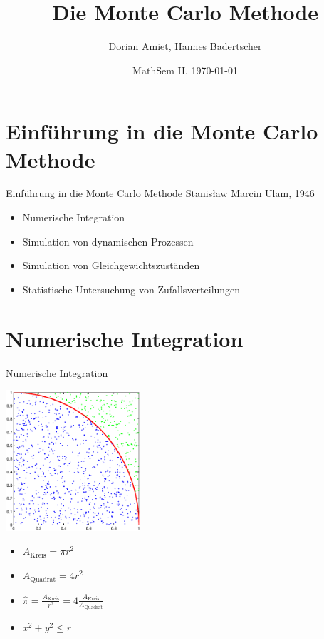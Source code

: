\documentclass{beamer}
\title[Monte Carlo]{Die Monte Carlo Methode}
\author[Amiet, Badertscher]{Dorian Amiet, Hannes Badertscher}
\date [MathSem II, FS14]{MathSem II, \today}
\begin{document}
\begin{frame}
	\titlepage
\end{frame}
	
\section[Einführung]{Einführung in die Monte Carlo Methode}
\begin{frame}{Einführung in die Monte Carlo Methode}
	Stanisław Marcin Ulam, 1946 
	\begin{itemize}
	\item Numerische Integration
	\item Simulation von dynamischen Prozessen
	\item Simulation von Gleichgewichtszuständen
	\item Statistische Untersuchung von Zufallsverteilungen
	\end{itemize}
\end{frame}

\section{Numerische Integration}
\begin{frame}{Numerische Integration}

	\begin{minipage}{5cm}
		\includegraphics[width=5cm]{images/kreis_hitmiss.eps}
	\end{minipage}
	\begin{minipage}{5cm}
		\begin{itemize}
		\item<1-> $A_{\text{Kreis}} = \pi r^{2}$
		\item<1-> $A_{\text{Quadrat}} = 4r^2$
		\item<1-> $\hat{\pi} = \frac{A_{\text{Kreis}}}{r^2} = 4 \frac{A_{\text{Kreis}}}{A_{\text{Quadrat}}}$
		\item<1-> $x^2 + y^2 \leq r$
		\end{itemize}
	\end{minipage}
\end{frame}
\end{document}
